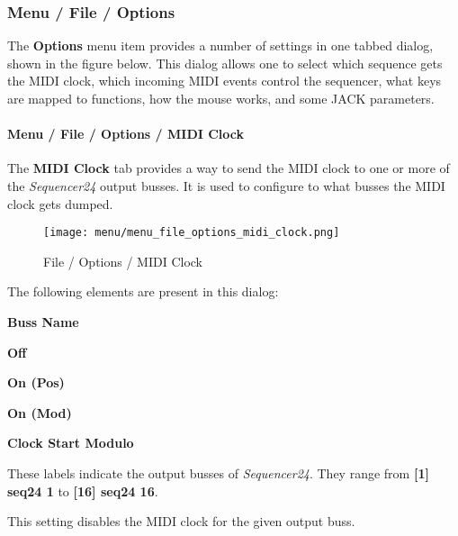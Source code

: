 \subsubsection{Menu / File / Options}
\label{subsubsec:seq24_menu_file_options}

   The \textbf{Options} menu item provides a number of settings in one
   tabbed dialog, shown in the figure below.
   This dialog allows one to select which sequence gets the MIDI
   clock, which incoming MIDI events control the sequencer, what keys are
   mapped to functions, how the mouse works, and some JACK parameters.

\paragraph{Menu / File / Options / MIDI Clock}
\label{paragraph:seq24_menu_file_options_midi_clock}

   The \textbf{MIDI Clock} tab provides a way to send the MIDI clock to one
   or more of the \textsl{Sequencer24} output busses.
   It is used to configure to what busses the MIDI clock gets dumped.

\begin{figure}[H]
   \centering 
   \texttt{[image: menu/menu\_file\_options\_midi\_clock.png]}
   \caption{File / Options / MIDI Clock}
   \label{fig:seq24_menu_file_options_midi_clock}
\end{figure}

   The following elements are present in this dialog:

   \begin{enumber}
      \item \textbf{Buss Name}
      \item \textbf{Off}
      \item \textbf{On (Pos)}
      \item \textbf{On (Mod)}
      \item \textbf{Clock Start Modulo}
   \end{enumber}

   \setcounter{ItemCounter}{0}      %

   These labels indicate the output busses of \textsl{Sequencer24}.
   They range from \textbf{[1] seq24 1}
   to \textbf{[16] seq24 16}.

   This setting disables the MIDI clock for the given output buss.

